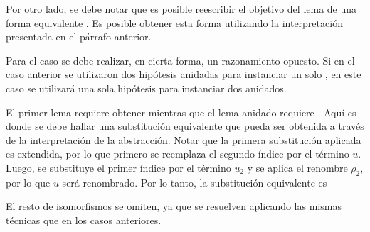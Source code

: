 Por otro lado, se debe notar que es posible reescribir el objetivo del lema de una forma equivalente
\subst
{}
{}.
Es posible obtener esta forma utilizando la interpretación presentada en el párrafo anterior.


Para el caso  se debe realizar, en cierta forma, un razonamiento opuesto.
Si en el caso anterior se utilizaron dos hipótesis anidadas para instanciar un solo , en este caso se utilizará una sola hipótesis para instanciar dos  anidados.

El primer lema requiere obtener
\subst
{ }
{}
mientras que el lema anidado requiere
\subst
{}
{}.
Aquí es donde se debe hallar una substitución equivalente que pueda ser obtenida a través de la interpretación de la abstracción.
Notar que la primera substitución aplicada es extendida, por lo que primero se reemplaza el segundo índice por el término $u$.
Luego, se substituye el primer índice por el término $u_2$ y se aplica el renombre $\rho_2$, por lo que $u$ será renombrado.
Por lo tanto, la substitución equivalente es



El resto de isomorfismos se omiten, ya que se resuelven aplicando las mismas técnicas que en los casos anteriores.



